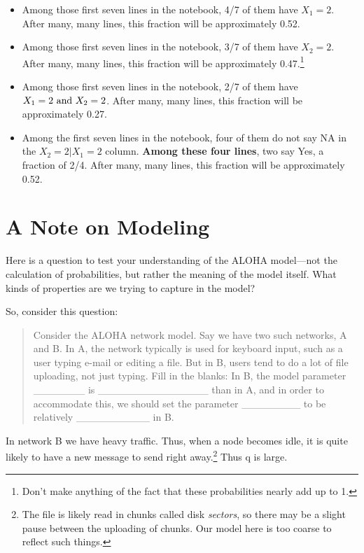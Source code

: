 \begin{itemize}

\item Among those first seven lines in the notebook, 4/7 of them have
$X_1 = 2$.  After many, many lines, this fraction will be
approximately 0.52.

\item Among those first seven lines in the notebook, 3/7 of them have
$X_2 = 2$.  After many, many lines, this fraction will be
approximately 0.47.\footnote{Don't make anything of the fact that these
probabilities nearly add up to 1.} 

\item Among those first seven lines in the notebook, 2/7 of them have
$X_1 = 2 {\rm ~and~ } X_2 = 2$.  After many, many lines, this fraction
will be approximately 0.27. 

\item Among the first seven lines in the notebook, four of them do not
say NA in the $X_2 = 2 | X_1 = 2$ column.  {\bf Among these four lines},
two say Yes, a fraction of 2/4.  After many, many lines, this
fraction will be approximately 0.52.

\end{itemize}

\section{A Note on Modeling}

Here is a question to test your understanding of the ALOHA model---not
the calculation of probabilities, but rather the meaning of the model
itself.  What kinds of properties are we trying to capture in the model?

So, consider this question:

\begin{quote} 

Consider the ALOHA network model.  Say we have two such networks, A and
B.  In A, the network typically is used for keyboard input, such as a
user typing e-mail or editing a file.  But in B, users tend to do a lot
of file uploading, not just typing.  Fill in the blanks:  In B, the
model parameter \_\_\_\_\_\_\_ is \_\_\_\_\_\_\_\_\_\_\_\_\_\_\_ than in
A, and in order to accommodate this, we should set the parameter
\_\_\_\_\_\_\_\_ to be relatively \_\_\_\_\_\_\_\_\_\_ in B.

\end{quote}

In network B we have heavy traffic.  Thus, when a node becomes idle, it
is quite likely to have a new message to send right away.\footnote{The
file is likely read in chunks called disk {\it sectors}, so there may be
a slight pause between the uploading of chunks.  Our model here is too
coarse to reflect such things.}  Thus q is large.

